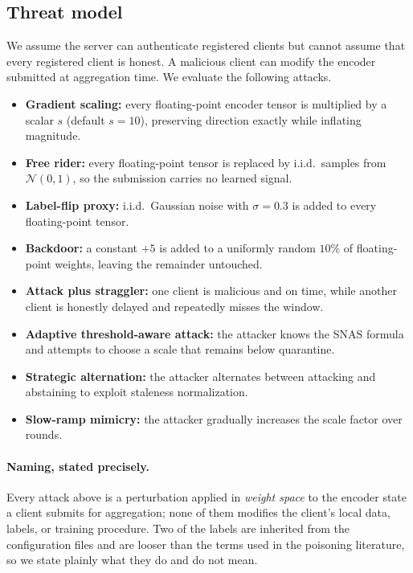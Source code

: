 \documentclass[pdflatex,sn-mathphys-num]{sn-jnl}
\begin{document}
\subsection{Threat model}

We assume the server can authenticate registered clients but cannot assume that every registered client is honest. A malicious client can modify the encoder submitted at aggregation time. We evaluate the following attacks.
\begin{itemize}
    \item \textbf{Gradient scaling:} every floating-point encoder tensor is multiplied by a scalar $s$ (default $s=10$), preserving direction exactly while inflating magnitude.
    \item \textbf{Free rider:} every floating-point tensor is replaced by i.i.d.\ samples from $\mathcal{N}(0,1)$, so the submission carries no learned signal.
    \item \textbf{Label-flip proxy:} i.i.d.\ Gaussian noise with $\sigma=0.3$ is added to every floating-point tensor.
    \item \textbf{Backdoor:} a constant $+5$ is added to a uniformly random $10\%$ of floating-point weights, leaving the remainder untouched.
    \item \textbf{Attack plus straggler:} one client is malicious and on time, while another client is honestly delayed and repeatedly misses the window.
    \item \textbf{Adaptive threshold-aware attack:} the attacker knows the SNAS formula and attempts to choose a scale that remains below quarantine.
    \item \textbf{Strategic alternation:} the attacker alternates between attacking and abstaining to exploit staleness normalization.
    \item \textbf{Slow-ramp mimicry:} the attacker gradually increases the scale factor over rounds.
\end{itemize}

\paragraph{Naming, stated precisely.} Every attack above is a perturbation applied in \emph{weight space} to the encoder state a client submits for aggregation; none of them modifies the client's local data, labels, or training procedure. Two of the labels are inherited from the configuration files and are looser than the terms used in the poisoning literature, so we state plainly what they do and do not mean.
\end{document}
